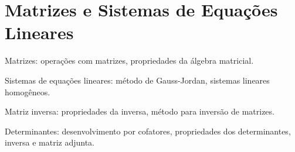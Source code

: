 \chapter{Matrizes e Sistemas de Equações Lineares}

Matrizes: operações com matrizes, propriedades da álgebra matricial.

Sistemas de equações lineares: método de Gauss-Jordan,
sistemas lineares homogêneos.

Matriz inversa: propriedades da inversa, método para inversão de matrizes.

Determinantes: desenvolvimento por cofatores, propriedades dos determinantes,
inversa e matriz adjunta.

